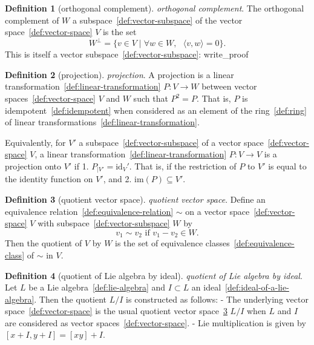 \documentclass[12pt,a4paper]{article}
\theoremstyle{definition}
\newtheorem{definition}{Definition}
\begin{document}
\begin{definition}[orthogonal complement]\label{def:orthogonal-complement}
\emph{orthogonal complement}. The orthogonal complement of $W$ a subspace~\ref{def:vector-subspace} of the vector space~\ref{def:vector-space} $V$ is the set $$W^\perp = \{v \in V \mid \forall w \in W, \text{ } \langle v, w\rangle = 0\}.$$ This is itself a vector subspace~\ref{def:vector-subspace}:
write_proof
\end{definition}

\begin{definition}[projection]\label{def:projection}
\emph{projection}. A projection is a linear transformation~\ref{def:linear-transformation} $P:V\to W$ between vector spaces~\ref{def:vector-space} $V$ and $W$ such that $P^2 = P$. That is, $P$ is idempotent~\ref{def:idempotent} when considered as an element of the ring~\ref{def:ring} of linear transformations~\ref{def:linear-transformation}.

Equivalently, for $V'$ a subspace~\ref{def:vector-subspace} of a vector space~\ref{def:vector-space} $V$, a linear transformation~\ref{def:linear-transformation} $P:V\to V$ is a projection onto $V'$ if 
1. $P_{\vert V'} = \text{id}_V'$. That is, if the restriction of $P$ to $V'$ is equal to the identity function on $V'$, and
2. $\text{im}(P) \subseteq V'$.
\end{definition}

\begin{definition}[quotient vector space]\label{def:quotient-vector-space}
\emph{quotient vector space}. Define an equivalence relation~\ref{def:equivalence-relation} $\sim$ on a vector space~\ref{def:vector-space} $V$ with subspace~\ref{def:vector-subspace} $W$ by $$v_1 \sim v_2 \text{ if } v_1-v_2 \in W.$$ Then the quotient of $V$ by $W$ is the set of equivalence classes~\ref{def:equivalence-class} of $\sim$ in $V$.
\end{definition}

\begin{definition}[quotient of Lie algebra by ideal]\label{def:quotient-of-lie-algebra-by-ideal}
\emph{quotient of Lie algebra by ideal}. Let $L$ be a Lie algebra~\ref{def:lie-algebra} and $I\subset L$ an ideal~\ref{def:ideal-of-a-lie-algebra}. Then the quotient $L / I$ is constructed as follows:
- The underlying vector space~\ref{def:vector-space} is the usual quotient vector space~\ref{def:quotient-vector-space} $L/I$ when $L$ and $I$ are considered as vector spaces~\ref{def:vector-space}. 
- Lie multiplication is given by $[x+I,y+I] = [xy]+I$.
\end{definition}
\end{document}
